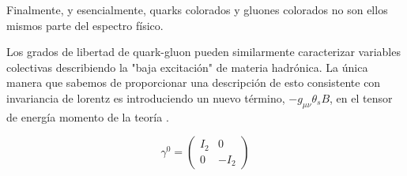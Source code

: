 Finalmente, y esencialmente, quarks colorados y gluones colorados no son ellos mismos parte del espectro físico.

Los grados de libertad de quark-gluon pueden similarmente caracterizar variables colectivas describiendo la "baja excitación" de materia hadrónica. La única manera que sabemos de proporcionar una descripción de esto consistente con invariancia de lorentz es introduciendo un nuevo término, $-{g}_{\mu \nu} {\theta}_{s} B$, en el tensor de energía momento de la teoría \cite{DeTar_1983, Bjorken_1965, Chodos_1974, Han_1965,Greiner2001, DeGrand_1975, Krutov2016}.

\[
{\gamma}^{0} = \left(
\begin{array}{cc}
{I}_{2} & 0\\
0 & -{I}_{2}
\end{array}
\right)
\]

















































